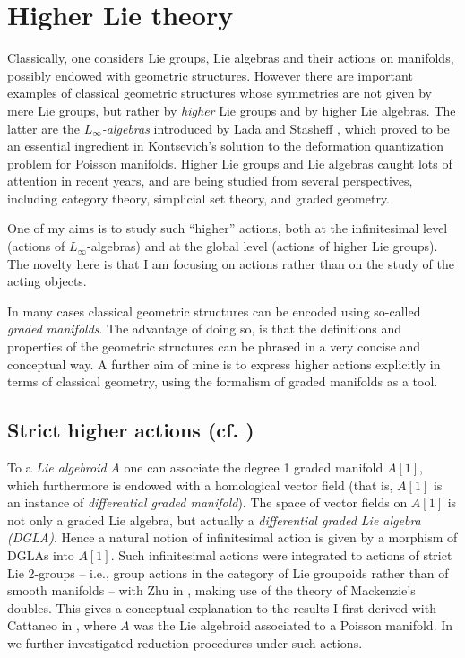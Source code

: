 \documentclass[11pt]{amsart}
\begin{document}
\section{Higher Lie theory}
Classically, one considers Lie groups, Lie algebras and their actions on manifolds, possibly endowed 
with geometric structures.  However there are important examples of  classical  geometric structures whose symmetries are not given by mere Lie groups, but rather by
 \emph{higher} Lie groups and  by {higher}  Lie algebras. The latter are  the \emph{$L_{\infty}$-algebras}  introduced by Lada and Stasheff \cite{LadaStasheff}, which proved to be an essential ingredient in Kontsevich's solution to the deformation quantization problem for Poisson manifolds.  Higher Lie groups and 
Lie algebras caught lots of attention in recent years, and are being studied from several 
perspectives, including category theory,  simplicial set theory, and graded geometry.

One of my aims is to study such ``higher'' actions, both at the  infinitesimal level  (actions of $L_{\infty}$-algebras) and at the global level (actions of higher Lie groups). The novelty here is 
that I am focusing on actions rather than on the study of the acting objects. 

In many cases   classical geometric structures can be encoded using so-called \emph{graded manifolds}. The 
advantage of doing so, is that the definitions and properties of the geometric structures can be phrased 
in a very concise and conceptual way. A further aim of mine is to express higher actions  explicitly in terms of 
classical geometry,  using  the formalism of graded manifolds as a tool. 


\subsection{Strict higher actions  (cf. \cite{BCMZ2}\cite{BCMZ}\cite{CZ2}\cite{ZZL})}\label{strictha}
To a \emph{Lie algebroid} $A$ one can associate the degree 1 graded manifold $A[1]$, which furthermore is 
endowed with a homological vector field (that is, $A[1]$ is an instance of \emph{differential graded  manifold}). 
The space of vector fields on $A[1]$ is not only a graded Lie algebra, but actually a \emph{differential graded Lie 
algebra (DGLA)}. Hence a natural notion of infinitesimal action is given by a morphism 
of DGLAs into $A[1]$.  Such infinitesimal actions were integrated to actions of 
strict Lie 2-groups -- i.e., group actions in the category of
Lie groupoids rather than of smooth manifolds -- 
 with Zhu in \cite{ZZL}, making 
use of the theory of Mackenzie's doubles. This gives a conceptual explanation to the results I first derived with Cattaneo in \cite{CZ2},  where $A$ was the Lie algebroid associated to a Poisson manifold. 
In \cite{CZ2} we further investigated reduction procedures under such actions.
\end{document}
